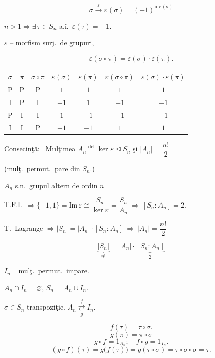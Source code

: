 \[
\sigma \xrightarrow{\ \varepsilon\ } \varepsilon(\sigma) = (-1)^{\text{inv}(\sigma)}
\]

\noindent $n>1 \Rightarrow \exists\,\tau\in S_n$ a.î.\ $\varepsilon(\tau)=-1$.

\bigskip
\noindent $\varepsilon$ -- morfism surj.\ de grupuri,

\[
\varepsilon(\sigma\circ\pi) = \varepsilon(\sigma)\cdot\varepsilon(\pi).
\]

\bigskip
\begin{center}
\begin{tabular}{|c|c|c|c|c|c|c|}
\hline
$\sigma$ & $\pi$ & $\sigma\circ\pi$ & $\varepsilon(\sigma)$ & $\varepsilon(\pi)$ & $\varepsilon(\sigma\circ\pi)$ & $\varepsilon(\sigma)\cdot\varepsilon(\pi)$ \\
\hline
P & P & P & $1$ & $1$ & $1$ & $1$ \\
\hline
I & P & I & $-1$ & $1$ & $-1$ & $-1$ \\
\hline
P & I & I & $1$ & $-1$ & $-1$ & $-1$ \\
\hline
I & I & P & $-1$ & $-1$ & $1$ & $1$ \\
\hline
\end{tabular}
\end{center}

\bigskip
\noindent\underline{Consecinţă}: \ Mulţimea $A_n \overset{\text{def}}{=} \ker\varepsilon \trianglelefteq S_n$ şi $|A_n| = \dfrac{n!}{2}$

\noindent (mulţ.\ permut.\ pare din $S_n$.)

\noindent $A_n$ s.n.\ \underline{grupul altern de ordin $n$}

\bigskip
\noindent T.F.I.\ $\Rightarrow \{-1,1\} = \text{Im}\,\varepsilon \cong \dfrac{S_n}{\ker\varepsilon} = \dfrac{S_n}{A_n} \ \Rightarrow \ [S_n:A_n]=2.$

\bigskip
\noindent T.\ Lagrange $\Rightarrow |S_n| = |A_n|\cdot[S_n:A_n] \ \Rightarrow \ |A_n| = \dfrac{n!}{2}$

\[
\underbrace{|S_n|}_{n!} = |A_n|\cdot\underbrace{[S_n:A_n]}_{2}
\]

\bigskip
\noindent $I_n$= mulţ.\ permut.\ impare.

\noindent $A_n\cap I_n=\varnothing$, \quad $S_n = A_n\cup I_n$.

\bigskip
\noindent $\sigma\in S_n$ transpoziţie. \qquad $A_n \underset{g}{\overset{f}{\rightleftarrows}} I_n$.

\[
f(\tau) = \tau\circ\sigma.
\]
\[
g(\pi) = \pi\circ\sigma
\]
\[
g\circ f = 1_{A_n}; \quad f\circ g = 1_{I_n}.
\]
\[
(g\circ f)(\tau) = g\big(f(\tau)\big) = g(\tau\circ\sigma) = \tau\circ\sigma\circ\sigma = \tau.
\]





